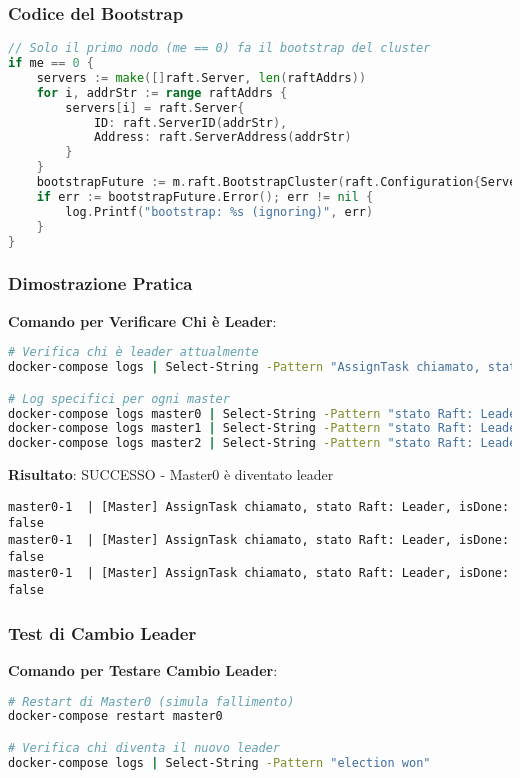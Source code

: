 \documentclass[12pt,a4paper]{article}
\begin{document}
\subsubsection{Codice del Bootstrap}

\begin{lstlisting}[language=go]
// Solo il primo nodo (me == 0) fa il bootstrap del cluster
if me == 0 {
    servers := make([]raft.Server, len(raftAddrs))
    for i, addrStr := range raftAddrs {
        servers[i] = raft.Server{
            ID: raft.ServerID(addrStr), 
            Address: raft.ServerAddress(addrStr)
        }
    }
    bootstrapFuture := m.raft.BootstrapCluster(raft.Configuration{Servers: servers})
    if err := bootstrapFuture.Error(); err != nil {
        log.Printf("bootstrap: %s (ignoring)", err)
    }
}
\end{lstlisting}

\subsubsection{Dimostrazione Pratica}

\textbf{Comando per Verificare Chi è Leader}:
\begin{lstlisting}[language=bash]
# Verifica chi è leader attualmente
docker-compose logs | Select-String -Pattern "AssignTask chiamato, stato Raft: Leader"

# Log specifici per ogni master
docker-compose logs master0 | Select-String -Pattern "stato Raft: Leader"
docker-compose logs master1 | Select-String -Pattern "stato Raft: Leader"
docker-compose logs master2 | Select-String -Pattern "stato Raft: Leader"
\end{lstlisting}

\textbf{Risultato}: SUCCESSO - Master0 è diventato leader
\begin{lstlisting}
master0-1  | [Master] AssignTask chiamato, stato Raft: Leader, isDone: false
master0-1  | [Master] AssignTask chiamato, stato Raft: Leader, isDone: false
master0-1  | [Master] AssignTask chiamato, stato Raft: Leader, isDone: false
\end{lstlisting}

\subsubsection{Test di Cambio Leader}

\textbf{Comando per Testare Cambio Leader}:
\begin{lstlisting}[language=bash]
# Restart di Master0 (simula fallimento)
docker-compose restart master0

# Verifica chi diventa il nuovo leader
docker-compose logs | Select-String -Pattern "election won"
\end{lstlisting}
\end{document}
